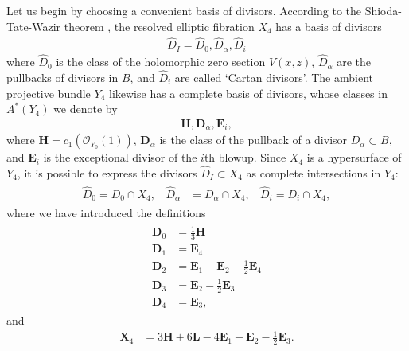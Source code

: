 \documentclass[11pt,oneside,english]{article}
\numberwithin{equation}{section}
\theoremstyle{definition}
\begin{document}
Let us begin by choosing a convenient basis of divisors. According to the Shioda-Tate-Wazir theorem \cite{wazir2004arithmetic}, the resolved elliptic fibration $X_4$ has a basis of divisors 
	\begin{align}
	\label{eqn:Xbasis}
		\hat D_I = \hat D_0, \hat D_\alpha, \hat D_i
	\end{align}
where $\hat D_0$ is the class of the holomorphic zero section $V(x , z )$, $\hat D_\alpha$ are the pullbacks of divisors in $B$, and $\hat D_i$ are called `Cartan divisors'. The ambient projective bundle $Y_4$ likewise has a complete basis of divisors, whose classes in $A^*(Y_4)$ we denote by
	\begin{align}
		 \boldsymbol{H}, \boldsymbol{D}_\alpha, \boldsymbol{E}_i,
	\end{align}
where $\boldsymbol{H} = c_1(\mathcal O_{Y_0}(1))$, $\boldsymbol{D}_\alpha$ is the class of the pullback of a divisor $D_\alpha 
\subset B$, and $\boldsymbol{E}_i$ is the exceptional divisor of the $i$th blowup. Since $X_4$ is a hypersurface of $Y_4$, it is possible to express the divisors $\hat D_I \subset X_4$ as complete intersections in $Y_4$: 
	\begin{align}
	\begin{split}
		\hat D_0 ={D}_0\cap  {X}_4,~~~~\hat D_\alpha &= {D}_\alpha \cap {X}_4,~~~~ \hat D_i = {D}_i \cap {X}_4,
	\end{split}
	\end{align}
where we have introduced the definitions
	\begin{align}
	\begin{split}	
	\label{eqn:SU5Dbasis}	
		\boldsymbol{D}_0 &= \frac{1}{3} \boldsymbol{H} \\
		\boldsymbol{D}_1 &=  \boldsymbol{E}_4 \\
			\boldsymbol{D}_2 &=\boldsymbol{E}_1 - \boldsymbol{E}_2 -\frac{1}{2} \boldsymbol{E}_4 \\
			\boldsymbol{D}_3&= \boldsymbol{E}_2 - \frac{1}{2} \boldsymbol{E}_3    \\
		\boldsymbol{D}_4& = \boldsymbol{E}_3,
	\end{split}
	\end{align}
and
	\begin{align}
	\label{eqn:X4class}
		\boldsymbol{X}_4 &= 3 \boldsymbol{H} + 6 \boldsymbol{L} - 4 \boldsymbol{E}_1 - \boldsymbol{E}_2 - \frac{1}{2} \boldsymbol{E}_3. 
	\end{align}
\end{document}
